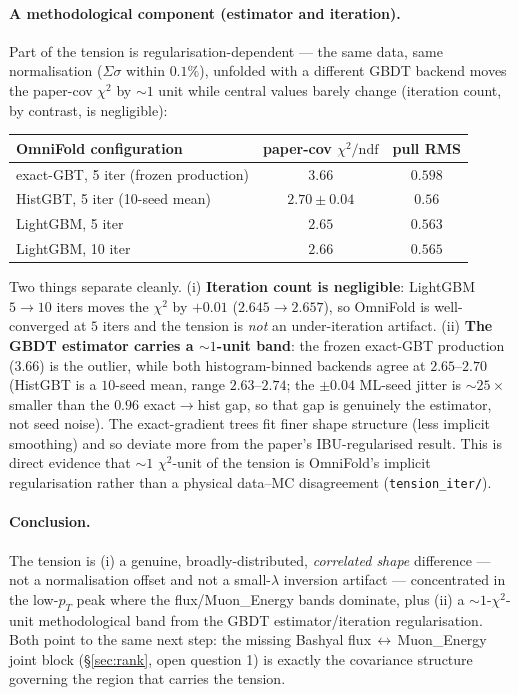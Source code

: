 \documentclass[12pt]{article}
\newcommand{\pT}{p_{T}}
\begin{document}
\paragraph{A methodological component (estimator and iteration).}
Part of the tension is regularisation-dependent --- the same data, same
normalisation ($\Sigma\sigma$ within $0.1\%$), unfolded with a different
GBDT backend moves the paper-cov $\chi^{2}$ by $\sim1$ unit while central
values barely change (iteration count, by contrast, is negligible):
\begin{center}
\begin{tabular}{@{}lcc@{}}
\toprule
OmniFold configuration & paper-cov $\chi^{2}/\mathrm{ndf}$ & pull RMS \\
\midrule
exact-GBT, 5 iter (frozen production) & $3.66$ & $0.598$ \\
HistGBT, 5 iter (10-seed mean) & $2.70\pm0.04$ & $0.56$ \\
LightGBM, 5 iter & $2.65$ & $0.563$ \\
LightGBM, 10 iter & $2.66$ & $0.565$ \\
\bottomrule
\end{tabular}
\end{center}
Two things separate cleanly. (i) \textbf{Iteration count is negligible}:
LightGBM $5\to10$ iters moves the $\chi^{2}$ by $+0.01$ ($2.645\to2.657$),
so OmniFold is well-converged at $5$ iters and the tension is \emph{not}
an under-iteration artifact. (ii) \textbf{The GBDT estimator carries a
$\sim1$-unit band}: the frozen exact-GBT production ($3.66$) is the
outlier, while both histogram-binned backends agree at $2.65$--$2.70$
(HistGBT is a $10$-seed mean, range $2.63$--$2.74$; the $\pm0.04$ ML-seed
jitter is $\sim25\times$ smaller than the $0.96$ exact$\to$hist gap, so
that gap is genuinely the estimator, not seed noise). The exact-gradient
trees fit finer shape structure (less implicit smoothing) and so deviate
more from the paper's IBU-regularised result. This is direct evidence
that $\sim1$ $\chi^{2}$-unit of the tension is OmniFold's implicit
regularisation rather than a physical data--MC disagreement
(\texttt{tension\_iter/}).

\paragraph{Conclusion.}
The tension is (i) a genuine, broadly-distributed, \emph{correlated shape}
difference --- not a normalisation offset and not a small-$\lambda$
inversion artifact --- concentrated in the low-$\pT$ peak where the
flux/Muon\_Energy bands dominate, plus (ii) a $\sim1$-$\chi^{2}$-unit
methodological band from the GBDT estimator/iteration regularisation.
Both point to the same next step: the missing Bashyal
flux\,$\leftrightarrow$\,Muon\_Energy joint block (\S\ref{sec:rank},
open question 1) is exactly the covariance structure governing the region
that carries the tension.
\end{document}
